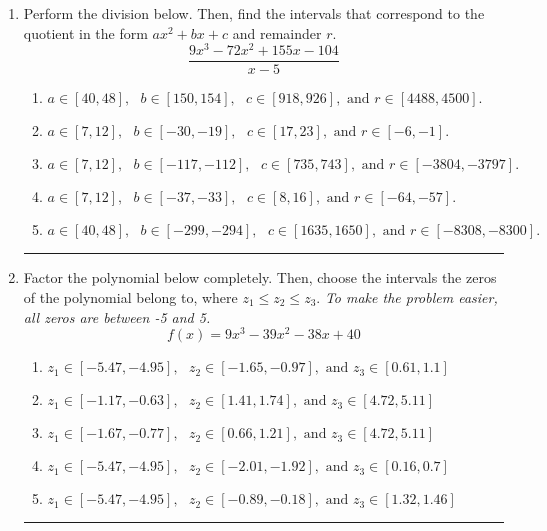 \documentclass[14pt]{extbook}
\newcommand{\litem}[1]{\item#1\hspace*{-1cm}\rule{\textwidth}{0.4pt}}
\begin{document}
\begin{enumerate}
\litem{
Perform the division below. Then, find the intervals that correspond to the quotient in the form $ax^2+bx+c$ and remainder $r$.\[ \frac{9x^{3} -72 x^{2} +155 x -104}{x -5} \]\begin{enumerate}[label=\Alph*.]
\item \( a \in [40, 48], \text{   } b \in [150, 154], \text{   } c \in [918, 926], \text{   and   } r \in [4488, 4500]. \)
\item \( a \in [7, 12], \text{   } b \in [-30, -19], \text{   } c \in [17, 23], \text{   and   } r \in [-6, -1]. \)
\item \( a \in [7, 12], \text{   } b \in [-117, -112], \text{   } c \in [735, 743], \text{   and   } r \in [-3804, -3797]. \)
\item \( a \in [7, 12], \text{   } b \in [-37, -33], \text{   } c \in [8, 16], \text{   and   } r \in [-64, -57]. \)
\item \( a \in [40, 48], \text{   } b \in [-299, -294], \text{   } c \in [1635, 1650], \text{   and   } r \in [-8308, -8300]. \)

\end{enumerate} }
\litem{
Factor the polynomial below completely. Then, choose the intervals the zeros of the polynomial belong to, where $z_1 \leq z_2 \leq z_3$. \textit{To make the problem easier, all zeros are between -5 and 5.}\[ f(x) = 9x^{3} -39 x^{2} -38 x + 40 \]\begin{enumerate}[label=\Alph*.]
\item \( z_1 \in [-5.47, -4.95], \text{   }  z_2 \in [-1.65, -0.97], \text{   and   } z_3 \in [0.61, 1.1] \)
\item \( z_1 \in [-1.17, -0.63], \text{   }  z_2 \in [1.41, 1.74], \text{   and   } z_3 \in [4.72, 5.11] \)
\item \( z_1 \in [-1.67, -0.77], \text{   }  z_2 \in [0.66, 1.21], \text{   and   } z_3 \in [4.72, 5.11] \)
\item \( z_1 \in [-5.47, -4.95], \text{   }  z_2 \in [-2.01, -1.92], \text{   and   } z_3 \in [0.16, 0.7] \)
\item \( z_1 \in [-5.47, -4.95], \text{   }  z_2 \in [-0.89, -0.18], \text{   and   } z_3 \in [1.32, 1.46] \)


\end{enumerate}}
\end{enumerate}
\end{document}
